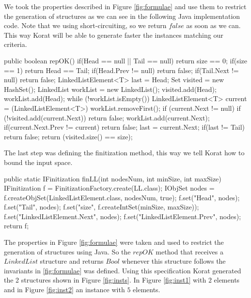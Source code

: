 \documentclass[a4paper,UKenglish]{oasics}
\begin{document}
We took the properties described in Figure \ref{fig:formulae} and use them to restrict the generation of structures as we can see in the following Java implementation code.
Note that we using short-circuiting, so we return $false$ as soon as we can. This way Korat will be able to generate faster the instances matching our criteria.

\begin{code}
public boolean repOK() {
  if(Head == null || Tail == null)
    return size == 0;
  if(size == 1) return Head == Tail;
  if(Head.Prev != null) return false;
  if(Tail.Next != null) return false;
  LinkedListElement<T> last = Head;
  Set visited = new HashSet();
  LinkedList workList = new LinkedList();
  visited.add(Head);
  workList.add(Head);
  while (!workList.isEmpty()) {
    LinkedListElement<T> current = (LinkedListElement<T>) workList.removeFirst();
    if (current.Next != null) {
      if (!visited.add(current.Next))
	    return false;
      workList.add(current.Next);
      if(current.Next.Prev != current) return false;
      last = current.Next;
    }
  }
  if(last != Tail)
    return false;
  return (visited.size() == size);
}
\end{code}

The last step was defining the finitization method, this way we tell Korat how to bound the input space.

\begin{code}
public static IFinitization finLL(int nodesNum, int minSize, int maxSize) {
  IFinitization f = FinitizationFactory.create(LL.class);
  IObjSet nodes = f.createObjSet(LinkedListElement.class, nodesNum, true);
  f.set("Head", nodes);
  f.set("Tail", nodes);
  f.set("size", f.createIntSet(minSize, maxSize));
  f.set("LinkedListElement.Next", nodes);
  f.set("LinkedListElement.Prev", nodes);
  return f;
}
\end{code}

The properties in Figure \ref{fig:formulae} were taken and used to restrict the generation of structures using Java. So the $repOK$ method that receives
a $LinkedList$ structure and returns $Bool$ whenever this structure follows the invariants in \ref{fig:formulae} was defined.
Using this specification Korat generated the 2 structures shown in Figure \ref{fig:insts}. In Figure \ref{fig:inst1} with $2$ elements
and in Figure \ref{fig:inst2} an instance with $5$ elements.
\end{document}
